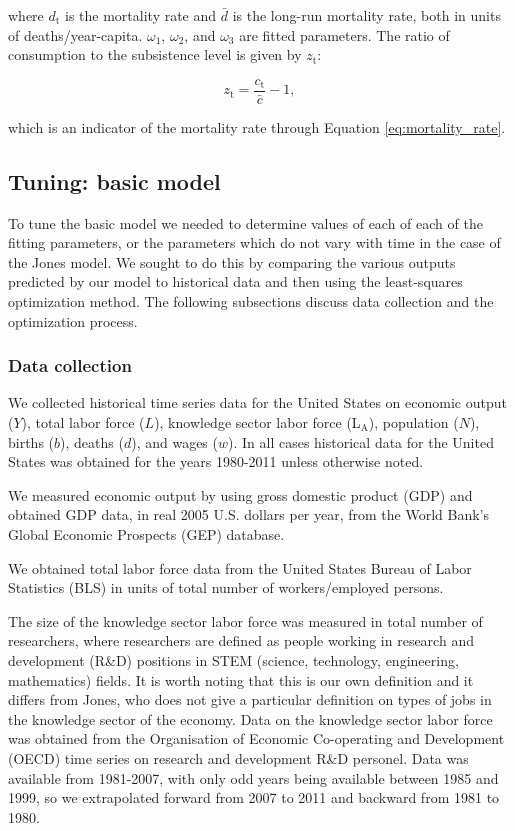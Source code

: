 \documentclass[letterpaper,12pt]{article}
\begin{document}
\noindent where $d_\mathrm{t}$ is the mortality rate and $\bar d$ is the long-run mortality rate, both in units of deaths/year-capita. $\omega_\mathrm{1}$, $\omega_\mathrm{2}$, and $\omega_\mathrm{3}$ are fitted parameters. The ratio of consumption to the subsistence level is given by $z_\mathrm{t}$:

\begin{equation} \label{eq:z}
	z_\mathrm{t} = \frac{c_\mathrm{t}}{\bar c} - 1, 
\end{equation}

\noindent which is an indicator of the mortality rate through Equation \ref{eq:mortality_rate}.

\subsection{Tuning: basic model}
\label{sec:Tuning_basic_model}

To tune the basic model we needed to determine values of each of each of the fitting parameters, or the parameters which do not vary with time in the case of the Jones model. We sought to do this by comparing the various outputs predicted by our model to historical data and then using the least-squares optimization method. The following subsections discuss data collection and the optimization process.

\subsubsection{Data collection}
We collected historical time series data for the United States on economic output ($Y$), total labor force ($L$), knowledge sector labor force (L$_\mathrm{A}$), population ($N$), births ($b$), deaths ($d$), and wages ($w$). In all cases historical data for the United States was obtained for the years 1980-2011 unless otherwise noted. 

We measured economic output by using gross domestic product (GDP) and obtained GDP data, in real 2005 U.S. dollars per year, from the World Bank's Global Economic Prospects (GEP) database. 

We obtained total labor force data from the United States Bureau of Labor Statistics (BLS) in units of total number of workers/employed persons.

The size of the knowledge sector labor force was measured in total number of researchers, where researchers are defined as people working in research and development (R\&D) positions in STEM (science, technology, engineering, mathematics) fields. It is worth noting that this is our own definition and it differs from Jones, who does not give a particular definition on types of jobs in the knowledge sector of the economy. Data on the knowledge sector labor force was obtained from the Organisation of Economic Co-operating and Development (OECD) time series on research and development R\&D personel. Data was available from 1981-2007, with only odd years being available between 1985 and 1999, so we extrapolated forward from 2007 to 2011 and backward from 1981 to 1980.
\end{document}
